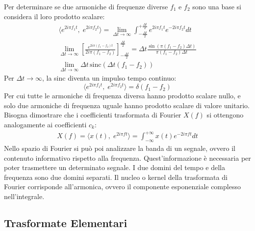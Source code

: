 \documentclass{article}
\numberwithin{equation}{subsection}
\begin{document}
Per determinare se due armoniche di frequenze diverse $f_1$ e $f_2$ sono una base si considera il loro prodotto scalare:
\begin{gather*}
    \langle e^{2i\pi f_1t},\;e^{2i\pi f_2t}\rangle=\displaystyle\lim_{\Delta t\to\infty}\int_{-\frac{\Delta t}{2}}^{+\frac{\Delta t}{2}}e^{2i\pi f_1t}e^{-2i\pi f_2t}dt\\
    \displaystyle\lim_{\Delta t\to\infty}\left[\frac{e^{2i\pi(f_1-f_2)t}}{2i\pi(f_1-f_2)}\right]^{\frac{\Delta t}{2}}_{-\frac{\Delta t}{2}}=
    \Delta t\frac{\sin(\pi(f_1-f_2)\Delta t)}{\pi(f_1-f_2)\Delta t}\\
    \displaystyle\lim_{\Delta t\to\infty}\Delta t\,\mbox{sinc}(\Delta t(f_1-f_2))
\end{gather*}
Per $\Delta t\to\infty$, la sinc diventa un impulso tempo continuo:
\begin{equation*}
    \langle e^{2i\pi f_1t},\;e^{2i\pi f_2t}\rangle=\delta(f_1-f_2)
\end{equation*}
Per cui tutte le armoniche di frequenza diversa hanno prodotto scalare nullo, e solo due armoniche di frequenza uguale hanno prodotto scalare di valore unitario. 
Bisogna dimostrare che i coefficienti trasformata di Fourier $X(f)$ si ottengono analogamente ai coefficienti $c_k$:
\begin{gather*}
    X(f)=\langle x(t),\;e^{2i\pi ft}\rangle=\displaystyle\int_{-\infty}^{+\infty}x(t)e^{-2i\pi ft}dt
\end{gather*}
Nello spazio di Fourier si può poi analizzare la banda di un segnale, ovvero il contenuto informativo rispetto alla frequenza. Quest'informazione è necessaria per poter 
trasmettere un determinato segnale. I due domini del tempo e della frequenza sono due domini separati. 
Il nucleo o kernel della trasformata di Fourier corrisponde all'armonica, ovvero il componente esponenziale complesso nell'integrale. 

\subsection{Trasformate Elementari}
\end{document}
